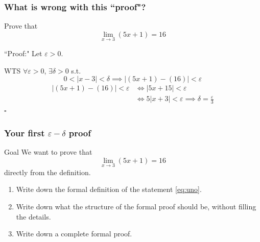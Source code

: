 \documentclass[14pt]{beamer}
\newcommand{\e}{\varepsilon}
\newcommand{\p}{\pause}
\newcommand{\setsize}[1]{\fontsize{#1}{#1}\selectfont} %
\newcommand{\smallerfont}{\setsize{13}} %
\begin{document}

\begin{frame}
\frametitle{What is wrong with this ``proof"?}
\smallerfont
\vspace{-2mm}
\begin{block}{}%
Prove that 
$$
\lim_{x\to 3} (5x+1) = 16
$$
\end{block}

\begin{block}{``Proof:"}
	Let $\e>0$.

	WTS $\forall \e>0$, $\exists\delta>0$ s.t. 
		$$  0<|x-3|<\delta \implies |(5x+1) - (16)|<\e$$
\vspace{-3mm}
	\begin{align*}
		|(5x+1) - (16)|<\varepsilon &\iff |5x+15|<\e \\
		&\iff 5|x+3|<\e \implies\delta=\frac{\e}{3}
	\end{align*}
\hfill $\square$
\end{block}

\end{frame}


\begin{frame}[t]
\frametitle{Your first $\e-\delta$ proof}

\begin{block}{Goal}
	We want to prove that
		\begin{equation} \label{eq:uno}
			\lim_{x \to 3} \left( 5x + 1 \right) = 16
		\end{equation}
	directly from the definition.
\end{block}
\vfill 
\begin{enumerate}
\p		\item  Write down the formal definition of the statement \eqref{eq:uno}.
\p		\item  Write down what the structure of the formal proof should be, without filling the details.
\p		\item  Write down a complete formal proof.
\end{enumerate}
\vfill
\end{frame}
\end{document}
